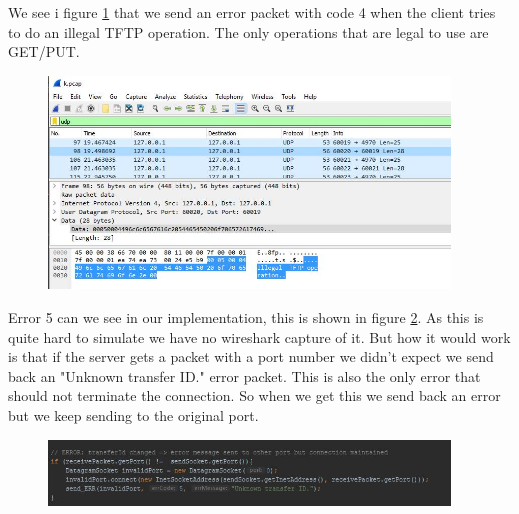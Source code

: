 \documentclass[a4paper,12pt]{article}
\numberwithin{figure}{section}
\begin{document}
\noindent We see i figure \ref{error 4} that we send an error packet with code 4 when the client tries to do an illegal TFTP operation. The only operations that are legal to use are GET/PUT. 
\begin{figure}[h!]
	\centering
	\includegraphics[width=0.95\textwidth,keepaspectratio]{img/error4.jpg} 
	\caption{}
	\label{error 4}
\end{figure}

\noindent Error 5 can we see in our implementation, this is shown in figure \ref{error 5}. As this is quite hard to simulate we have no wireshark capture of it. But how it would work is that if the server gets a packet with a port number we didn't expect we send back an "Unknown transfer ID."\cite{RFC1350} error packet. This is also the only error that should not terminate the connection. So when we get this we send back an error but we keep sending to the original port.   

\begin{figure}[h!]
	\centering
	\includegraphics[width=0.95\textwidth,keepaspectratio]{img/error5.jpg} 
	\caption{}
	\label{error 5}
\end{figure}

\newpage


\end{document}
